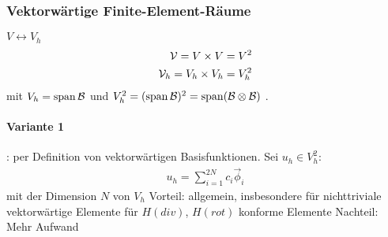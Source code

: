 \subsubsection{Vektorwärtige Finite-Element-Räume}
$V \leftrightarrow V_h$
\begin{align*}
  {\cal V} = V \times V = V^2\\
{\cal V}_h = V_h \times V_h = V_h^2
\end{align*}
mit $V_h = \operatorname{span} {\cal B}$ und $V_h^2 = (\operatorname{span} {\cal B})^2 = \operatorname{span}({\cal B} \otimes{\cal B})$ . 

\paragraph{Variante 1}: per Definition von vektorwärtigen Basisfunktionen. Sei  $  u_h \in V_h^2 $:
\begin{align*}
u_h = \sum_{i = 1}^{2N} c_i \vec \phi_i
\end{align*}
mit der Dimension $N$ von $V_h$
Vorteil: allgemein, insbesondere für nichttriviale vektorwärtige Elemente für $H(div)$, $H(rot)$ konforme Elemente
Nachteil: Mehr Aufwand

